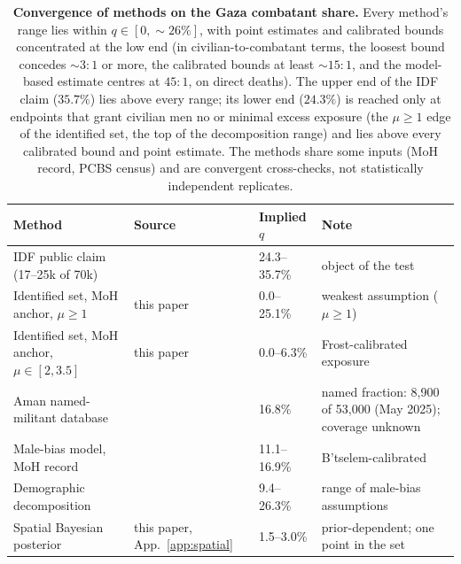 \begin{table}[ht]
\centering
\caption{\textbf{Convergence of methods on the Gaza combatant share.} Every method's range lies within $q\in[0,{\sim}26\%]$, with point estimates and calibrated bounds concentrated at the low end (in civilian-to-combatant terms, the loosest bound concedes ${\sim}3{:}1$ or more, the calibrated bounds at least ${\sim}15{:}1$, and the model-based estimate centres at $45{:}1$, on direct deaths). The upper end of the IDF claim ($35.7\%$) lies above every range; its lower end ($24.3\%$) is reached only at endpoints that grant civilian men no or minimal excess exposure (the $\mu\ge 1$ edge of the identified set, the top of the decomposition range) and lies above every calibrated bound and point estimate. The methods share some inputs (MoH record, PCBS census) and are convergent cross-checks, not statistically independent replicates.}
\label{tab:convergence}
\begin{footnotesize}
\renewcommand{\arraystretch}{1.3}
\begin{tabularx}{\textwidth}{@{}>{\raggedright\arraybackslash}Xll>{\raggedright\arraybackslash}X@{}}
\toprule
Method & Source & Implied $q$ & Note \\
\midrule
IDF public claim (17--25k of 70k) & \citep{idfclaim} & 24.3--35.7\% & object of the test \\
\midrule
Identified set, MoH anchor, $\mu\ge 1$ & this paper & 0.0--25.1\% & weakest assumption ($\mu\ge 1$) \\
Identified set, MoH anchor, $\mu\in[2,3.5]$ & this paper & 0.0--6.3\% & Frost-calibrated exposure \\
Aman named-militant database & \citep{guardian972db2025} & 16.8\% & named fraction: 8,900 of 53,000 (May 2025); coverage unknown \\
Male-bias model, MoH record & \citep{frost2026} & 11.1--16.9\% & B'tselem-calibrated \\
Demographic decomposition & \citep{cockerill2024} & 9.4--26.3\% & range of male-bias assumptions \\
Spatial Bayesian posterior & this paper, App.~\ref{app:spatial} & 1.5--3.0\% & prior-dependent; one point in the set \\
\bottomrule
\end{tabularx}
\end{footnotesize}
\end{table}
